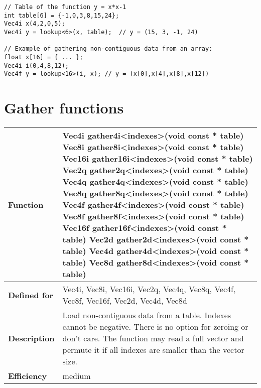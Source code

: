 \documentclass[vcl_manual.tex]{subfiles}
\begin{document}
\begin{lstlisting}[frame=none]
// Table of the function y = x*x-1
int table[6] = {-1,0,3,8,15,24};
Vec4i x(4,2,0,5);
Vec4i y = lookup<6>(x, table);  // y = (15, 3, -1, 24)

// Example of gathering non-contiguous data from an array:
float x[16] = { ... };
Vec4i i(0,4,8,12);
Vec4f y = lookup<16>(i, x); // y = (x[0],x[4],x[8],x[12])
\end{lstlisting}


\section{Gather functions}\label{GatherFunctions}

\begin{tabular}{|p{30mm}|p{120mm}|} \hline
\bfseries Function & 
Vec4i gather4i\textless indexes\textgreater(void const * table) \newline
Vec8i gather8i\textless indexes\textgreater(void const * table) \newline
Vec16i gather16i\textless indexes\textgreater(void const * table) \newline
Vec2q gather2q\textless indexes\textgreater(void const * table) \newline
Vec4q gather4q\textless indexes\textgreater(void const * table) \newline
Vec8q gather8q\textless indexes\textgreater(void const * table) \newline
Vec4f gather4f\textless indexes\textgreater(void const * table) \newline
Vec8f gather8f\textless indexes\textgreater(void const * table) \newline
Vec16f gather16f\textless indexes\textgreater(void const * table) \newline
Vec2d gather2d\textless indexes\textgreater(void const * table) \newline
Vec4d gather4d\textless indexes\textgreater(void const * table) \newline
Vec8d gather8d\textless indexes\textgreater(void const * table) \\ \hline
\bfseries Defined for & Vec4i, Vec8i, Vec16i, Vec2q, Vec4q, Vec8q, \newline
Vec4f, Vec8f, Vec16f, Vec2d, Vec4d, Vec8d \\ \hline
\bfseries Description & Load non-contiguous data from a table. Indexes cannot be negative. There is no option for zeroing or don't care.  \newline
The function may read a full vector and permute it if all indexes are smaller than the vector size.  \\ \hline
\bfseries Efficiency & medium \\ \hline
\end{tabular}
\end{document}
